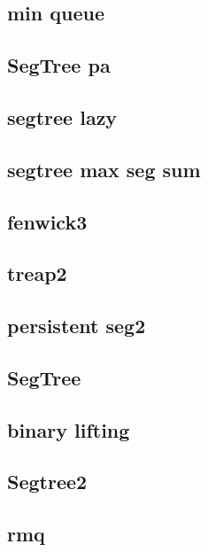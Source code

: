 \subsection{min queue}
\raggedbottom
\hrulefill
\subsection{SegTree pa}
\raggedbottom
\hrulefill
\subsection{segtree lazy}
\raggedbottom
\hrulefill
\subsection{segtree max seg sum}
\raggedbottom
\hrulefill
\subsection{fenwick3}
\raggedbottom
\hrulefill
\subsection{treap2}
\raggedbottom
\hrulefill
\subsection{persistent seg2}
\raggedbottom
\hrulefill
\subsection{SegTree}
\raggedbottom
\hrulefill
\subsection{binary lifting}
\raggedbottom
\hrulefill
\subsection{Segtree2}
\raggedbottom
\hrulefill
\subsection{rmq}
\raggedbottom
\hrulefill
